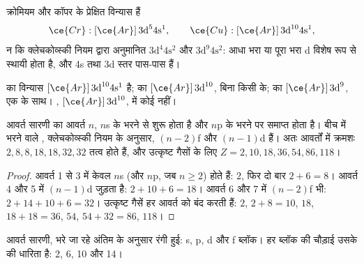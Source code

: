 \begin{proposition}\label{prop:b1:quantum-numbers:exceptions}
क्रोमियम और कॉपर के प्रेक्षित  विन्यास हैं
\[
  \ce{Cr}: [\ce{Ar}]\,3\text{d}^5 4\text{s}^1, \qquad
  \ce{Cu}: [\ce{Ar}]\,3\text{d}^{10} 4\text{s}^1 ,
\]
न कि क्लेचकोव्स्की नियम द्वारा अनुमानित $3\text{d}^4 4\text{s}^2$ और $3\text{d}^9 4\text{s}^2$:
आधा भरा या पूरा भरा d 
विशेष रूप से स्थायी होता है, और 4s तथा 3d स्तर पास-पास हैं।
\end{proposition}

\begin{example}\label{ex:b1:quantum-numbers:copper}
 का विन्यास $[\ce{Ar}]\,3\text{d}^{10} 4\text{s}^1$ है;  का
$[\ce{Ar}]\,3\text{d}^{10}$, बिना किसी  के;  का
$[\ce{Ar}]\,3\text{d}^9$, एक  के साथ। , $[\ce{Ar}]\,3\text{d}^{10}$,
में कोई नहीं।
\end{example}

\begin{proposition}[विन्यास और आवर्त सारणी]\label{prop:b1:quantum-numbers:table}
आवर्त सारणी का आवर्त $n$, $n$s के भरने से शुरू होता है और
$n$p के भरने पर समाप्त होता है। बीच में भरने वाले , क्लेचकोव्स्की
नियम के अनुसार, $(n-2)$f और $(n-1)$d हैं। अतः आवर्तों में क्रमशः
$2, 8, 8, 18, 18, 32, 32$ तत्व होते हैं, और उत्कृष्ट गैसों के लिए $Z = 2, 10,
18, 36, 54, 86, 118$।
\end{proposition}

\begin{proof}
आवर्त 1 से 3 में केवल $n$s (और $n$p, जब $n \ge 2$) होते हैं: $2$, फिर
दो बार $2 + 6 = 8$। आवर्त 4 और 5 में $(n-1)$d जुड़ता है: $2 + 10 + 6 =
18$। आवर्त 6 और 7 में $(n-2)$f भी: $2 + 14 + 10 + 6 = 32$। उत्कृष्ट
गैसें हर आवर्त को बंद करती हैं: $2$, $2 + 8 = 10$, $18$, $18 + 18 = 36$,
$54$, $54 + 32 = 86$, $118$।
\end{proof}

\begin{omfigure}
\omperiodictable[colour=blocks, legend]

{\small आवर्त सारणी, भरे जा रहे अंतिम  के अनुसार रंगी हुई:
s, p, d और f ब्लॉक। हर ब्लॉक की चौड़ाई उसके  की धारिता है:
2, 6, 10 और 14।}
\end{omfigure}

